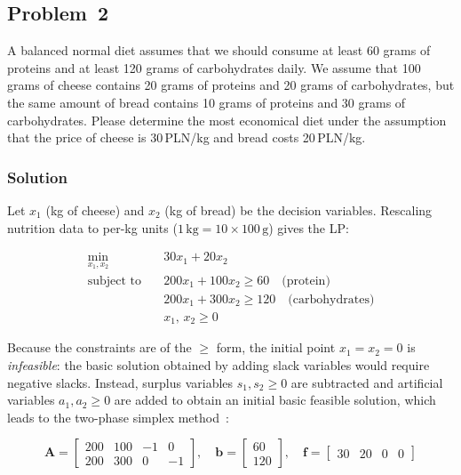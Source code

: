 \subsection{Problem~2}%
\label{problem:2}

A balanced normal diet assumes that we should consume at least 60 grams of
proteins and at least 120 grams of carbohydrates daily. We assume that 100 grams of cheese
contains 20 grams of proteins and 20 grams of carbohydrates, but the same amount of bread
contains 10 grams of proteins and 30 grams of carbohydrates. Please determine the most
economical diet under the assumption that the price of cheese is 30\,PLN/kg and bread costs
20\,PLN/kg.

\subsubsection*{Solution}

Let $x_1$ (kg of cheese) and $x_2$ (kg of bread) be the decision variables.
Rescaling nutrition data to per-kg units ($1\,\text{kg} = 10 \times 100\,\text{g}$) gives the LP:

\begin{equation*}
\begin{split}
    \min_{x_1,x_2}\ & 30x_1 + 20x_2 \\
    \text{subject to}\quad
        & 200x_1 + 100x_2 \geq 60 \quad\text{(protein)} \\
        & 200x_1 + 300x_2 \geq 120 \quad\text{(carbohydrates)} \\
        & x_1,\, x_2 \geq 0
\end{split}
\end{equation*}

Because the constraints are of the $\geq$ form, the initial point $x_1 = x_2 = 0$ is
\emph{infeasible}: the basic solution obtained by adding slack variables would require
negative slacks.
Instead, surplus variables $s_1, s_2 \geq 0$ are subtracted and artificial variables
$a_1, a_2 \geq 0$ are added to obtain an initial basic feasible solution, which leads to
the two-phase simplex method~\cite{Zdunek}:

\begin{equation*}
    \mathbf{A} =
    \begin{bmatrix}
        200 & 100 & -1 & 0 \\
        200 & 300 &  0 & -1
    \end{bmatrix},\quad
    \mathbf{b} = \begin{bmatrix} 60 \\ 120 \end{bmatrix},\quad
    \mathbf{f} = \begin{bmatrix} 30 & 20 & 0 & 0 \end{bmatrix}
\end{equation*}

